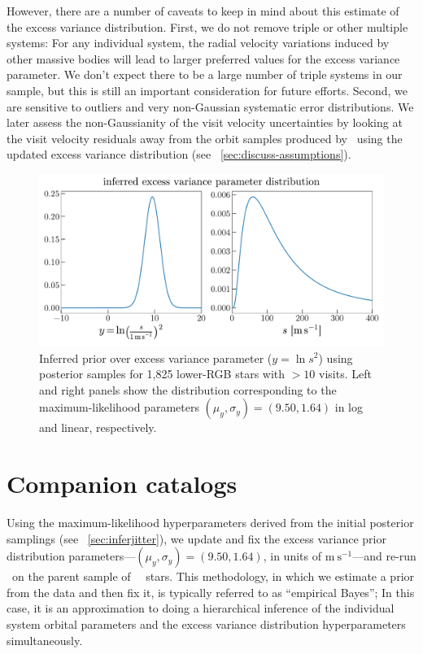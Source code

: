 \documentclass[modern, letterpaper]{aastex62}
\newcommand{\apogee}{\project{\acronym{APOGEE}}}
\newcommand{\thejoker}{\project{The~Joker}}
\newcommand{\DR}{\acronym{DR14}}
\begin{document}
However, there are a number of caveats to keep in mind about this estimate of
the excess variance distribution.
First, we do not remove triple or other multiple systems: For any individual
system, the radial velocity variations induced by other massive bodies will lead
to larger preferred values for the excess variance parameter.
We don't expect there to be a large number of triple systems in our sample, but
this is still an important consideration for future efforts.
Second, we are sensitive to outliers and very non-Gaussian systematic error
distributions.
We later assess the non-Gaussianity of the visit velocity uncertainties by
looking at the visit velocity residuals away from the orbit samples produced by
\thejoker\ using the updated excess variance distribution (see
\sectionname~\ref{sec:discuss-assumptions}).

\begin{figure}[h]
\begin{center}
\includegraphics[width=\textwidth]{infer-jitter}
\end{center}
\caption{%
Inferred prior over excess variance parameter ($y = \ln s^2$) using posterior
samples for 1,825 lower-RGB stars with $>10$ visits.
Left and right panels show the distribution corresponding to the
maximum-likelihood parameters $(\mu_y, \sigma_y) = (9.50, 1.64)$ in log and
linear, respectively.
\label{fig:infer-jitter}
}
\end{figure}


\section{Companion catalogs}
\label{sec:catalogs}

Using the maximum-likelihood hyperparameters derived from the initial posterior
samplings (see \sectionname~\ref{sec:inferjitter}), we update and fix the
excess variance prior distribution parameters---$(\mu_{y}, \sigma_{y}) = (9.50,
1.64)$, in units of $\textrm{m}~\textrm{s}^{-1}$---and re-run \thejoker\ on the
parent sample of \apogee\ \DR\ stars.
This methodology, in which we estimate a prior from the data and then fix it, is
typically referred to as ``empirical Bayes''; In this case, it is an
approximation to doing a hierarchical inference of the individual system orbital
parameters and the excess variance distribution hyperparameters simultaneously.
\end{document}
